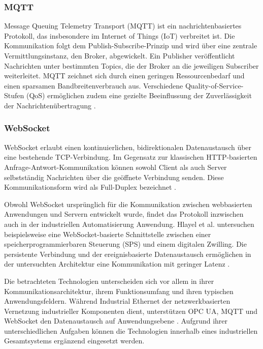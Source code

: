 \subsubsection{MQTT}

Message Queuing Telemetry Transport (MQTT) ist ein nachrichtenbasiertes Protokoll, das insbesondere im Internet of Things (IoT) verbreitet ist. Die Kommunikation folgt dem Publish-Subscribe-Prinzip und wird über eine zentrale Vermittlungsinstanz, den Broker, abgewickelt. Ein Publisher veröffentlicht Nachrichten unter bestimmten Topics, die der Broker an die jeweiligen Subscriber weiterleitet. MQTT zeichnet sich durch einen geringen Ressourcenbedarf und einen sparsamen Bandbreitenverbrauch aus. Verschiedene Quality-of-Service-Stufen (QoS) ermöglichen
zudem eine gezielte Beeinflussung der Zuverlässigkeit der Nachrichtenübertragung \cite{Profanter2019,Hlayel2026}.

\subsubsection{WebSocket}

WebSocket erlaubt einen kontinuierlichen, bidirektionalen Datenaustausch über eine bestehende TCP-Verbindung. Im Gegensatz zur klassischen HTTP-basierten Anfrage-Antwort-Kommunikation können sowohl Client als auch Server selbstständig Nachrichten über die geöffnete Verbindung senden. Diese Kommunikationsform wird als Full-Duplex bezeichnet \cite{Hlayel2026}.

Obwohl WebSocket ursprünglich für die Kommunikation zwischen webbasierten Anwendungen und Servern entwickelt wurde, findet das Protokoll inzwischen auch in der industriellen Automatisierung Anwendung. Hlayel et al. untersuchen beispielsweise eine WebSocket-basierte Schnittstelle zwischen einer speicherprogrammierbaren Steuerung (SPS) und einem digitalen Zwilling. Die persistente Verbindung und der ereignisbasierte Datenaustausch ermöglichen in der untersuchten Architektur eine Kommunikation mit geringer Latenz \cite{Hlayel2026}.

Die betrachteten Technologien unterscheiden sich vor allem in ihrer Kommunikationsarchitektur, ihrem Funktionsumfang und ihren typischen Anwendungsfeldern. Während Industrial Ethernet der netzwerkbasierten Vernetzung industrieller Komponenten dient, unterstützen OPC UA, MQTT und WebSocket den Datenaustausch auf Anwendungsebene \cite{Halenar2023,Profanter2019,Hlayel2026}. Aufgrund ihrer unterschiedlichen Aufgaben können die
Technologien innerhalb eines industriellen Gesamtsystems ergänzend eingesetzt werden.

